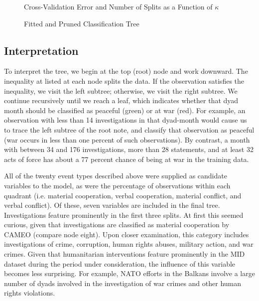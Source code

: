 \documentclass[12pt,letterpaper]{article}
\begin{document}
\begin{figure}
  \begin{center}
    
    \caption{Cross-Validation Error and Number of Splits as a Function of $\kappa$}
    \label{cpplot}
  \end{center}
\end{figure}

\begin{figure}
  \begin{center}
    
    \caption{Fitted and Pruned Classification Tree}
    \label{tree}
  \end{center}
\end{figure}

\subsection{Interpretation}

To interpret the tree, we begin at the top (root) node and work downward. The inequality at listed at each node splits the data. If the observation satisfies the inequality, we visit the left subtree; otherwise, we visit the right subtree. We continue recursively until we reach a leaf, which indicates whether that dyad month should be classified as peaceful (green) or at war (red). For example, an observation with less than 14 investigations in that dyad-month would cause us to trace the left subtree of the root note, and classify that observation as peaceful (war occurs in less than one percent of such observations). By contrast, a month with between 34 and 176 investigations, more than 28 statements, and at least 32 acts of force has about a 77 percent chance of being at war in the training data. 

All of the twenty event types described above were supplied as candidate variables to the model, as were the percentage of observations within each quadrant (i.e. material cooperation, verbal cooperation, material conflict, and verbal conflict). Of these, seven variables are included in the final tree. Investigations feature prominently in the first three splits. At first this seemed curious, given that investigations are classified as material cooperation by CAMEO (compare node eight). Upon closer examination, this category includes investigations of crime, corruption, human rights abuses, military action, and war crimes. Given that humanitarian interventions feature prominently in the MID dataset during the period under consideration, the influence of this variable becomes less surprising. For example, NATO efforts in the Balkans involve a large number of dyads involved in the investigation of war crimes and other human rights violations. 
\end{document}
